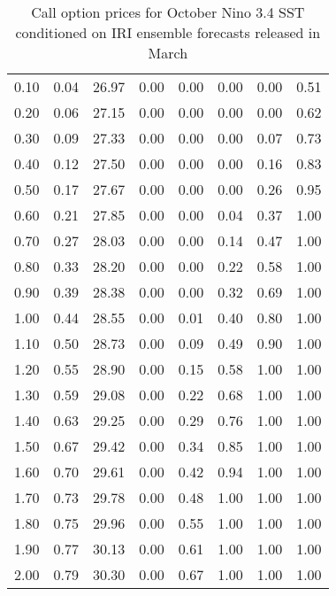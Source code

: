 \begin{table*}[ht]
\begin{tabular}{rrrrrrrr}
  0.10 & 0.04 & 26.97 & 0.00 & 0.00 & 0.00 & 0.00 & 0.51 \\ 
  0.20 & 0.06 & 27.15 & 0.00 & 0.00 & 0.00 & 0.00 & 0.62 \\ 
  0.30 & 0.09 & 27.33 & 0.00 & 0.00 & 0.00 & 0.07 & 0.73 \\ 
  0.40 & 0.12 & 27.50 & 0.00 & 0.00 & 0.00 & 0.16 & 0.83 \\ 
  0.50 & 0.17 & 27.67 & 0.00 & 0.00 & 0.00 & 0.26 & 0.95 \\ 
  0.60 & 0.21 & 27.85 & 0.00 & 0.00 & 0.04 & 0.37 & 1.00 \\ 
  0.70 & 0.27 & 28.03 & 0.00 & 0.00 & 0.14 & 0.47 & 1.00 \\ 
  0.80 & 0.33 & 28.20 & 0.00 & 0.00 & 0.22 & 0.58 & 1.00 \\ 
  0.90 & 0.39 & 28.38 & 0.00 & 0.00 & 0.32 & 0.69 & 1.00 \\ 
  1.00 & 0.44 & 28.55 & 0.00 & 0.01 & 0.40 & 0.80 & 1.00 \\ 
  1.10 & 0.50 & 28.73 & 0.00 & 0.09 & 0.49 & 0.90 & 1.00 \\ 
  1.20 & 0.55 & 28.90 & 0.00 & 0.15 & 0.58 & 1.00 & 1.00 \\ 
  1.30 & 0.59 & 29.08 & 0.00 & 0.22 & 0.68 & 1.00 & 1.00 \\ 
  1.40 & 0.63 & 29.25 & 0.00 & 0.29 & 0.76 & 1.00 & 1.00 \\ 
  1.50 & 0.67 & 29.42 & 0.00 & 0.34 & 0.85 & 1.00 & 1.00 \\ 
  1.60 & 0.70 & 29.61 & 0.00 & 0.42 & 0.94 & 1.00 & 1.00 \\ 
  1.70 & 0.73 & 29.78 & 0.00 & 0.48 & 1.00 & 1.00 & 1.00 \\ 
  1.80 & 0.75 & 29.96 & 0.00 & 0.55 & 1.00 & 1.00 & 1.00 \\ 
  1.90 & 0.77 & 30.13 & 0.00 & 0.61 & 1.00 & 1.00 & 1.00 \\ 
  2.00 & 0.79 & 30.30 & 0.00 & 0.67 & 1.00 & 1.00 & 1.00 \\ 
   \hline
\end{tabular}
\caption{Call option prices for October Nino 3.4 SST conditioned on IRI ensemble forecasts released in March} 
\end{table*}


